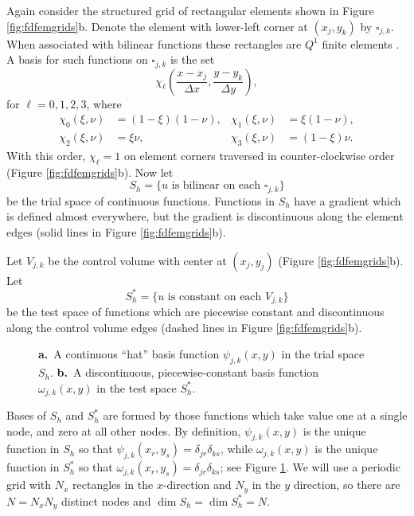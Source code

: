 \documentclass[twocolumn,letterpaper]{igs}
\begin{document}
Again consider the structured grid of rectangular elements shown in Figure \ref{fig:fdfemgrids}b.  Denote the element with lower-left corner at $(x_j,y_k)$ by $\square_{j,k}$.  When associated with bilinear functions these rectangles are $Q^1$ finite elements \citep{Elmanetal2005}.  A basis for such functions on $\square_{j,k}$ is the set
\begin{equation}
\chi_\ell \left(\frac{x-x_j}{\Delta x},\frac{y-y_k}{\Delta y}\right), \label{eq:elementbasis}
\end{equation}
for $\ell=0,1,2,3$, where
\begin{align*}
\chi_0(\xi,\nu) &= \left(1-\xi\right) \left(1-\nu\right), & \chi_1(\xi,\nu) &= \xi \left(1-\nu\right), \\
\chi_2(\xi,\nu) &= \xi \nu, & \chi_3(\xi,\nu) &= \left(1-\xi\right) \nu.
\end{align*}
With this order, $\chi_\ell=1$ on element corners traversed in counter-clockwise order (Figure \ref{fig:fdfemgrids}b).  Now let
\begin{equation}
S_h = \{u \text{ is bilinear on each $\square_{j,k}$}\}
\end{equation}
be the trial space of continuous functions.  Functions in $S_h$ have a gradient which is defined almost everywhere, but the gradient is discontinuous along the element edges (solid lines in Figure \ref{fig:fdfemgrids}b).

Let $V_{j,k}$ be the control volume with center at $(x_j,y_j)$ (Figure \ref{fig:fdfemgrids}b).  Let
\begin{equation}
S_h^* = \{u \text{ is constant on each $V_{j,k}$}\}
\end{equation}
be the test space of functions which are piecewise constant and discontinuous along the control volume edges (dashed lines in Figure \ref{fig:fdfemgrids}b).

\begin{figure}[ht]
\begin{center}
 \quad 
\end{center}
\caption{\textbf{a.}~A continuous ``hat'' basis function $\psi_{j,k}(x,y)$ in the trial space $S_h$.  \textbf{b.}~A discontinuous, piecewise-constant basis function $\omega_{j,k}(x,y)$ in the test space $S_h^*$.}
\label{fig:fembases}
\end{figure}

Bases of $S_h$ and $S_h^*$ are formed by those functions which take value one at a single node, and zero at all other nodes.  By definition, $\psi_{j,k}(x,y)$ is the unique function in $S_h$ so that $\psi_{j,k}(x_r,y_s) = \delta_{jr} \delta_{ks}$, while $\omega_{j,k}(x,y)$ is the unique function in $S_h^*$ so that $\omega_{j,k}(x_r,y_s) = \delta_{jr} \delta_{ks}$; see Figure \ref{fig:fembases}.  We will use a periodic grid with $N_x$ rectangles in the $x$-direction and $N_y$ in the $y$ direction, so there are $N=N_xN_y$ distinct nodes and $\dim S_h = \dim S_h^* = N$.  
\end{document}
